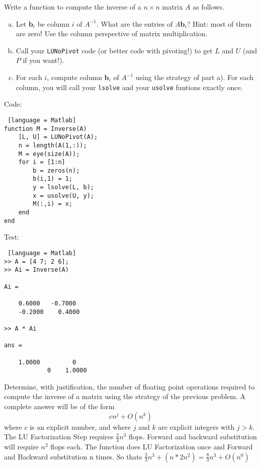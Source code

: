 \documentclass[12pt]{article}
\makeatletter
\theoremstyle{homework}
\newenvironment{exercise}[1]
{\def\@currentlabel{#1}\exercisecore}
{\endexercisecore}
\makeatother
\begin{document}
\begin{exercise}{Supplemental 1}
Write a function to compute the inverse of a $n\times n$ matrix $A$ as follows.
\begin{enumerate}[(a)]
	\item Let $\mathbf{b}_i$ be column $i$ of $A^{-1}$.  What
	are the entries of  $A \mathbf{b}_i$?  Hint: most of them are zero!
	Use the column perspective of matrix multiplication.
	\item Call your {\tt LUNoPivot} code (or better code with pivoting!)
	to get $L$ and $U$ (and $P$ if you want!).
	\item For each $i$, compute column $\mathbf{b}_i$ of $A^{-1}$
	using the strategy of part a).  For each column, you will call your {\tt lsolve} and your {\tt usolve} funtions exactly once.
\end{enumerate}
\end{exercise}
Code:
\begin{lstlisting} [language = Matlab]
function M = Inverse(A)
    [L, U] = LUNoPivot(A);
    n = length(A(1,:));
    M = eye(size(A));
    for i = [1:n]
        b = zeros(n);
        b(i,1) = 1;
        y = lsolve(L, b);
        x = usolve(U, y);
        M(:,i) = x;
    end
end
\end{lstlisting}
Test:
\begin{lstlisting} [language = Matlab]
>> A = [4 7; 2 6];
>> Ai = Inverse(A)

Ai =

    0.6000   -0.7000
    -0.2000    0.4000

>> A * Ai

ans =

    1.0000         0
            0    1.0000
\end{lstlisting}

\begin{exercise}{Supplemental 2}
Determine, with justification, the number of floating point operations 
required to compute the inverse of a matrix using the strategy of
the previous problem.  A complete answer will be of the form
\[
c n^j + O(n^k)
\]
where $c$ is an explicit number, and where $j$ and $k$ are explicit integers with $j>k$.
\end{exercise}
The LU Factorization Step requires $\frac{2}{3}n^3$ flops. Forward and backward substitution will require $n^2$ flops each.
The function does LU Factorization once and Forward and Backward substitution n times. So thats $\frac{2}{3}n^3 + (n * 2n^2) = \frac{8}{3}n^3 + O(n^0)$
\end{document}
